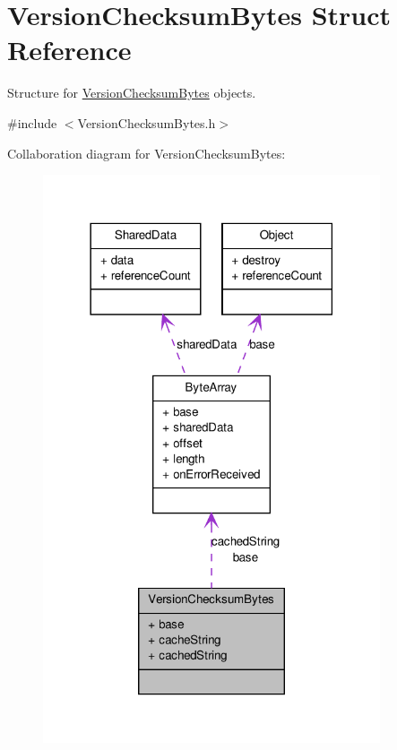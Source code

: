 \hypertarget{struct_version_checksum_bytes}{
\section{VersionChecksumBytes Struct Reference}
\label{struct_version_checksum_bytes}
}


Structure for \hyperlink{struct_version_checksum_bytes}{VersionChecksumBytes} objects.  




{\ttfamily \#include $<$VersionChecksumBytes.h$>$}



Collaboration diagram for VersionChecksumBytes:\nopagebreak
\begin{figure}[H]
\begin{center}
\leavevmode
\includegraphics[width=282pt]{struct_version_checksum_bytes__coll__graph}
\end{center}
\end{figure}

